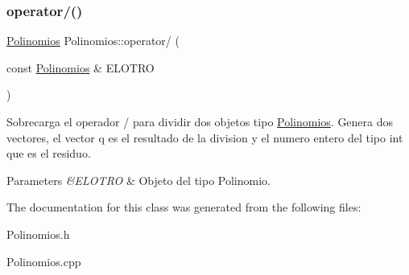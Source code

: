 \subsubsection{\texorpdfstring{operator/()}{operator/()}}
{\ttfamily \hyperlink{class_polinomios}{Polinomios} Polinomios\+::operator/ (\begin{DoxyParamCaption}\item[{const \hyperlink{class_polinomios}{Polinomios} \&}]{E\+L\+O\+T\+RO }\end{DoxyParamCaption})}



Sobrecarga el operador / para dividir dos objetos tipo \hyperlink{class_polinomios}{Polinomios}. Genera dos vectores, el vector q es el resultado de la division y el numero entero del tipo int que es el residuo. 


\begin{DoxyParams}{Parameters}
{\em \&\+E\+L\+O\+T\+RO} & Objeto del tipo Polinomio. \\
\hline
\end{DoxyParams}


The documentation for this class was generated from the following files\+:\begin{DoxyCompactItemize}
\item 
Polinomios.\+h\item 
Polinomios.\+cpp\end{DoxyCompactItemize}
